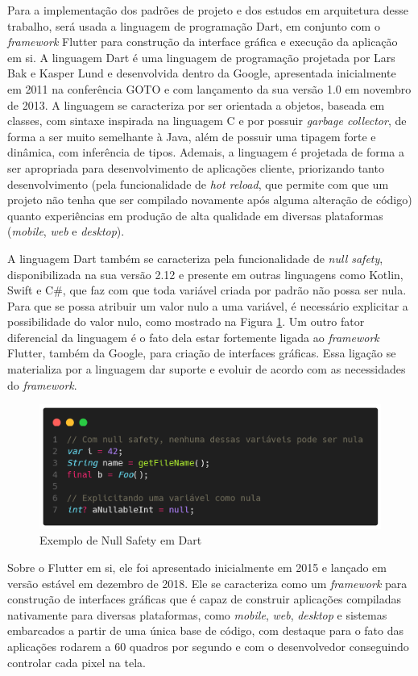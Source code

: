 \documentclass[12pt, %
openright, 
oneside, %
a4paper,    %
brazil]{facom-ufu-abntex2}
\begin{document}
Para a implementação dos padrões de projeto e dos estudos em arquitetura desse trabalho, será usada a linguagem de programação Dart, em conjunto com o \textit{framework} Flutter para construção da interface gráfica e execução da aplicação em si. A linguagem Dart é uma linguagem de programação projetada por Lars Bak e Kasper Lund e desenvolvida dentro da Google, apresentada inicialmente em 2011 na conferência GOTO e com lançamento da sua versão 1.0 em novembro de 2013. A linguagem se caracteriza por ser orientada a objetos, baseada em classes, com sintaxe inspirada na linguagem C e por possuir \textit{garbage collector}, de forma a ser muito semelhante à Java, além de possuir uma tipagem forte e dinâmica, com inferência de tipos. Ademais, a linguagem é projetada de forma a ser apropriada para desenvolvimento de aplicações cliente, priorizando tanto desenvolvimento (pela funcionalidade de \textit{hot reload}, que permite com que um projeto não tenha que ser compilado novamente após alguma alteração de código) quanto experiências em produção de alta qualidade em diversas plataformas (\textit{mobile}, \textit{web} e \textit{desktop}).

A linguagem Dart também se caracteriza pela funcionalidade de \textit{null safety}, disponibilizada na sua versão 2.12 e presente em outras linguagens como Kotlin, Swift e C\#, que faz com que toda variável criada por padrão não possa ser nula. Para que se possa atribuir um valor nulo a uma variável, é necessário explicitar a possibilidade do valor nulo, como mostrado na Figura \ref{fig:null_safety}. Um outro fator diferencial da linguagem é o fato dela estar fortemente ligada ao \textit{framework} Flutter, também da Google, para criação de interfaces gráficas. Essa ligação se materializa por a linguagem dar suporte e evoluir de acordo com as necessidades do \textit{framework}.

\begin{figure}[ht]
    \centering
    \includegraphics[width=.6\textwidth]{figures/bibliographical_review/null_safety.png}
    \caption{Exemplo de Null Safety em Dart}
    \label{fig:null_safety}
\end{figure}

Sobre o Flutter em si, ele foi apresentado inicialmente em 2015 e lançado em versão estável em dezembro de 2018. Ele se caracteriza como um \textit{framework} para construção de interfaces gráficas que é capaz de construir aplicações compiladas nativamente para diversas plataformas, como \textit{mobile}, \textit{web}, \textit{desktop} e sistemas embarcados a partir de uma única base de código, com destaque para o fato das aplicações rodarem a 60 quadros por segundo e com o desenvolvedor conseguindo controlar cada pixel na tela.
\end{document}
